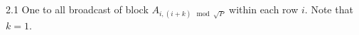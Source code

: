 \documentclass[preview]{standalone}
\begin{document}
\begin{center}
2.1 One to all broadcast of block $A_{i,(i+k) \mod \sqrt{P}}$ within each row $i$. Note that $k = 1$.
\end{center}
\end{document}
